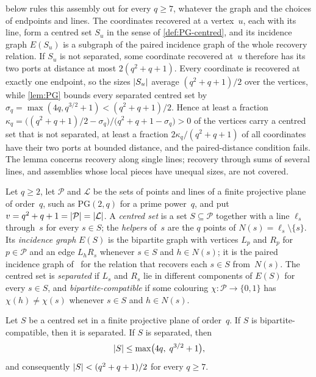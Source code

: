  below rules this assembly out for every $q\ge7$, whatever the graph and the choices of endpoints and lines.
The coordinates recovered at a vertex~$u$, each with its line, form a centred set $S_u$ in the sense of
\cref{def:PG-centred}, and its incidence graph $E(S_u)$ is a subgraph of the paired incidence graph of the whole
recovery relation. If $S_u$ is not separated, some coordinate recovered at~$u$ therefore has its two ports at distance at
most $2(q^2+q+1)$. Every coordinate is recovered at exactly one endpoint, so the sizes $\lvert S_u \rvert$ average
$(q^2+q+1)/2$ over the vertices, while \cref{lem:PG} bounds every separated centred set by
$\sigma_q=\max(4q,q^{3/2}+1)<(q^2+q+1)/2$. Hence at least a fraction
$\kappa_q=\bigl((q^2+q+1)/2-\sigma_q\bigr)/\bigl(q^2+q+1-\sigma_q\bigr)>0$ of the vertices carry a centred set that is
not separated, at least a fraction $2\kappa_q/(q^2+q+1)$ of all coordinates have their two ports at bounded distance, and
the paired-distance condition fails. The lemma concerns recovery along single lines; recovery through sums of several
lines, and assemblies whose local pieces have unequal sizes, are not covered.

\begin{definition}\label{def:PG-centred}
Let $q\ge2$, let $\mathcal P$ and $\mathcal L$ be the sets of points and lines of a finite projective plane of order~$q$,
such as $\mathrm{PG}(2,q)$ for a prime power~$q$, and put $v=q^2+q+1=\lvert \mathcal P \rvert=\lvert \mathcal L \rvert$. A \emph{centred set} is a set
$S\subseteq\mathcal P$ together with a line $\ell_s$ through~$s$ for every $s\in S$; the \emph{helpers} of~$s$ are the $q$
points of $N(s)=\ell_s\setminus\{s\}$. Its \emph{incidence graph} $E(S)$ is the bipartite graph with vertices $L_p$ and
$R_p$ for $p\in\mathcal P$ and an edge $L_hR_s$ whenever $s\in S$ and $h\in N(s)$; it is the paired incidence graph
of~\cite[Definition~2.3]{DirectedRecovery2026} for the relation that recovers each $s\in S$ from~$N(s)$. The centred set
is \emph{separated} if $L_s$ and $R_s$ lie in different components of $E(S)$ for every $s\in S$, and
\emph{bipartite-compatible} if some colouring $\chi\colon\mathcal P\to\{0,1\}$ has $\chi(h)\ne\chi(s)$ whenever $s\in S$
and $h\in N(s)$.
\end{definition}

\begin{lemma}\label{lem:PG}
Let $S$ be a centred set in a finite projective plane of order~$q$. If $S$ is bipartite-compatible, then it is
separated. If $S$ is separated, then
\begin{equation}\label{eq:PG-bound}
 \lvert S \rvert\le\max\bigl(4q,\;q^{3/2}+1\bigr),
\end{equation}
and consequently $\lvert S \rvert<(q^2+q+1)/2$ for every $q\ge7$.
\end{lemma}

